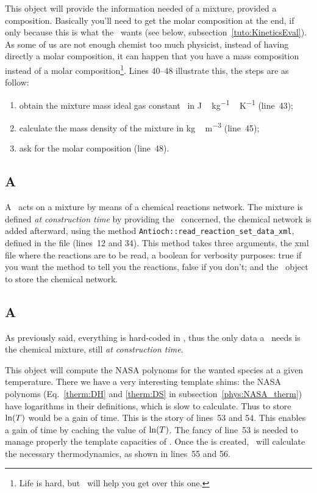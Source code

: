 This object will provide the information needed of a mixture, provided
a composition. Basically you'll need to get the molar composition
at the end, if only because this is what the \KineticsEvaluator\ wants
(see below, subsection~\ref{tuto:KineticsEval}). As some of us are
not enough chemist too much physicist, instead of having directly
a molar composition, it can happen that you have a mass composition
instead of a molar composition\footnote{Life is hard, but \Antioch\
will help you get over this one.}. Lines 40--48 illustrate this,
the steps are as follow:
\begin{enumerate}
\item obtain the mixture mass ideal gas constant \Rmix\ 
        in \unit{J\,kg^{-1}\,K^{-1}} (line~43);
\item calculate the mass density of the mixture in \unit{kg\,m^{-3}}
        (line~45);
\item ask for the molar composition (line~48).
\end{enumerate}


\subsection{A \ReactionSet}

A \ReactionSet\ acts on a mixture by means of a chemical reactions
network. The mixture is defined \emph{at construction time} by
providing the \ChemicalMixture\ concerned, the chemical network
is added afterward, using the method 
\verb!Antioch::read_reaction_set_data_xml!, defined in the file
 (lines~12 and 34). This
method takes three arguments, the xml file where the reactions are
to be read, a boolean for verbosity purposes: true if you want the
method to tell you the reactions, false if you don't; and the \ReactionSet\ 
object to store the chemical network.

\subsection{A \CEAThermodynamics}
\label{tuto:CEATherm}

As previously said, everything is hard-coded in \Antioch, thus
the only data a \CEAThermodynamics\ needs is the chemical
mixture, still \emph{at construction time}.

This object will compute the NASA polynoms for the wanted
species at a given temperature. There we have a very interesting
template shims: the NASA polynoms (Eq.~\ref{therm:DH} and \ref{therm:DS}
in subsection~\ref{phys:NASA_therm}) have logarithms in their
definitions, which is slow to calculate. Thus to store $\ln(\Temp)$
would be a gain of time. This is the story of lines~53 and 54. This
 enables a gain of time by caching the value
of $\ln(\Temp)$. The fancy of line~53 is needed to manage
properly the template capacities of \Antioch.
Once the \object{Cache} is created, \CEAThermodynamics\ will
calculate the necessary thermodynamics, as shown in lines~55
and 56.

